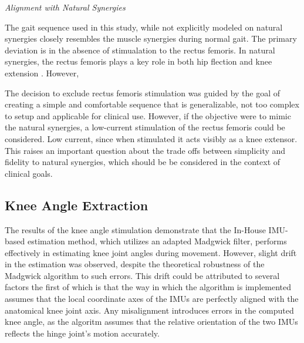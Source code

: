 \textit{Alignment with Natural Synergies}

The gait sequence used in this study, while not explicitly modeled on natural synergies closely resembles the muscle synergies during normal gait. The primary deviation is in the absence of stimualation to the rectus femoris. In natural synergies, the rectus femoris plays a key role in both hip flection and knee extension . However, 

The decision to exclude rectus femoris stimulation was guided by the goal of creating a simple and comfortable sequence that is generalizable, not too complex to setup and applicable for clinical use. However, if the objective were to mimic the natural synergies, a low-current stimulation of the rectus femoris could be considered. Low current, since when stimulated it acts visibly as a knee extensor. This raises an important question about the trade offs between simplicity and fidelity to natural synergies, which should be be considered in the context of clinical goals.

\subsection{Knee Angle Extraction}

The results of the knee angle stimulation demonstrate that the In-House IMU-based estimation method, which utilizes an adapted Madgwick filter, performs effectively in estimating knee joint angles during movement. However, slight drift in the estimation was observed, despite the theoretical robustness of the Madgwick algorithm to such errors. This drift could be attributed to several factors the first of which is that the way in which the algorithm is implemented assumes that the local coordinate axes of the IMUs are perfectly aligned with the anatomical knee joint axis. Any misalignment introduces errors in the computed knee angle, as the algoritm assumes that the relative orientation of the two IMUs reflects the hinge joint's motion accurately.

